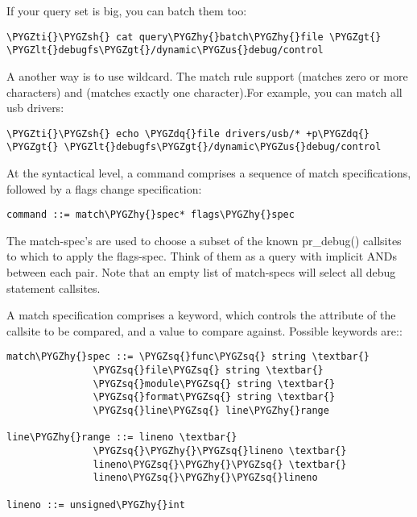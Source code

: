 \documentclass[a4paper,8pt,english]{sphinxmanual}
\def\PYGZus{\char`\_}
\def\PYGZlt{\char`\<}
\def\PYGZgt{\char`\>}
\def\PYGZsh{\char`\#}
\def\PYGZhy{\char`\-}
\def\PYGZsq{\char`\'}
\def\PYGZdq{\char`\"}
\def\PYGZti{\char`\~}
\renewcommand\PYGZsq{\textquotesingle}
\begin{document}
If your query set is big, you can batch them too:

\begin{Verbatim}[commandchars=\\\{\}]
\PYGZti{}\PYGZsh{} cat query\PYGZhy{}batch\PYGZhy{}file \PYGZgt{} \PYGZlt{}debugfs\PYGZgt{}/dynamic\PYGZus{}debug/control
\end{Verbatim}

A another way is to use wildcard. The match rule support \code{*} (matches
zero or more characters) and  (matches exactly one character).For
example, you can match all usb drivers:

\begin{Verbatim}[commandchars=\\\{\}]
\PYGZti{}\PYGZsh{} echo \PYGZdq{}file drivers/usb/* +p\PYGZdq{} \PYGZgt{} \PYGZlt{}debugfs\PYGZgt{}/dynamic\PYGZus{}debug/control
\end{Verbatim}

At the syntactical level, a command comprises a sequence of match
specifications, followed by a flags change specification:

\begin{Verbatim}[commandchars=\\\{\}]
command ::= match\PYGZhy{}spec* flags\PYGZhy{}spec
\end{Verbatim}

The match-spec's are used to choose a subset of the known pr\_debug()
callsites to which to apply the flags-spec.  Think of them as a query
with implicit ANDs between each pair.  Note that an empty list of
match-specs will select all debug statement callsites.

A match specification comprises a keyword, which controls the
attribute of the callsite to be compared, and a value to compare
against.  Possible keywords are::

\begin{Verbatim}[commandchars=\\\{\}]
match\PYGZhy{}spec ::= \PYGZsq{}func\PYGZsq{} string \textbar{}
               \PYGZsq{}file\PYGZsq{} string \textbar{}
               \PYGZsq{}module\PYGZsq{} string \textbar{}
               \PYGZsq{}format\PYGZsq{} string \textbar{}
               \PYGZsq{}line\PYGZsq{} line\PYGZhy{}range

line\PYGZhy{}range ::= lineno \textbar{}
               \PYGZsq{}\PYGZhy{}\PYGZsq{}lineno \textbar{}
               lineno\PYGZsq{}\PYGZhy{}\PYGZsq{} \textbar{}
               lineno\PYGZsq{}\PYGZhy{}\PYGZsq{}lineno

lineno ::= unsigned\PYGZhy{}int
\end{Verbatim}
\end{document}

